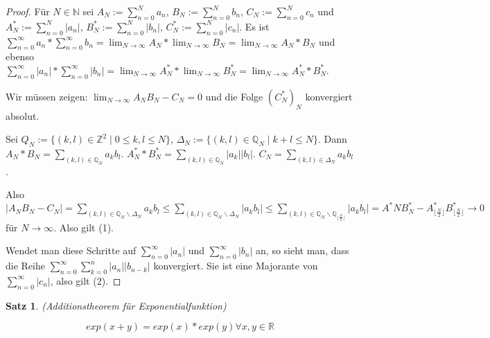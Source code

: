 \documentclass[a4paper,10pt]{article}
\newtheorem{satz}{Satz}
\begin{document}
\begin{proof}
 Für $N \in \mathbb{N}$ sei $A_N := \sum_{n = 0}^N a_n$, $B_N := \sum_{n = 0}^N b_n$, $C_N := \sum_{n = 0}^N c_n$ und $A^*_N := \sum_{n = 0}^N |a_n|$, $B^*_N := \sum_{n = 0}^N |b_n|$, $C^*_N := \sum_{n = 0}^N |c_n|$.
 Es ist $\sum_{n = 0}^\infty a_n * \sum_{n = 0}^\infty b_n = \lim_{N \rightarrow \infty} A_N * \lim_{N \rightarrow \infty} B_N = \lim_{N \rightarrow \infty} A_N * B_N$ und ebenso $\sum_{n = 0}^\infty |a_n| * \sum_{n = 0}^\infty |b_n| = \lim_{N \rightarrow \infty} A^*_N * \lim_{N \rightarrow \infty} B^*_N = \lim_{N \rightarrow \infty} A^*_N * B^*_N$.
 
 Wir müssen zeigen: $\lim_{N \rightarrow \infty} A_NB_N - C_N = 0$ und die Folge $(C^*_N)_N$ konvergiert absolut.
 
 Sei $Q_N := \{(k, l) \in \mathbb{Z}^2 \mid 0 \le k, l \le N\}$, $\Delta_N := \{(k, l) \in \mathbb{Q}_N \mid k + l \le N\}$.
 Dann $A_N * B_N = \sum_{(k, l) \in \mathbb{Q}_N} a_k b_l$.
 $A^*_N * B^*_N = \sum_{(k, l) \in \mathbb{Q}_N} |a_k| |b_l|$.
 $C_N = \sum_{(k, l) \in \Delta_N} a_k b_l$.
 
 Also $|A_NB_N - C_N| = \sum_{(k, l) \in \mathbb{Q}_N \backslash \Delta_N} a_k b_l \le \sum_{(k, l) \in \mathbb{Q}_N \backslash \Delta_N} |a_k b_l| \le \sum_{(k, l) \in \mathbb{Q}_N \backslash \mathbb{Q}_{\lfloor \frac{N}{2} \rfloor}} |a_k b_l| = A^*N B^*_N - A^*_{\lfloor \frac{N}{2} \rfloor}B^*_{\lfloor \frac{N}{2} \rfloor} \rightarrow 0$ für $N \rightarrow \infty$.
 Also gilt (1).
 
 Wendet man diese Schritte auf $\sum_{n = 0}^\infty |a_n|$ und $\sum_{n = 0}^\infty |b_n|$ an, so sieht man, dass die Reihe $\sum_{n = 0}^\infty \sum_{k = 0}^n |a_n| |b_{n - k}|$ konvergiert.
 Sie ist eine Majorante von $\sum_{n = 0}^\infty |c_n|$, also gilt (2).
\end{proof}

\begin{satz}
 (Additionstheorem für Exponentialfunktion)
 
 \begin{equation*}
  exp(x + y) = exp(x) * exp(y) \forall x, y \in \mathbb{R}
 \end{equation*}
\end{satz}
\end{document}
